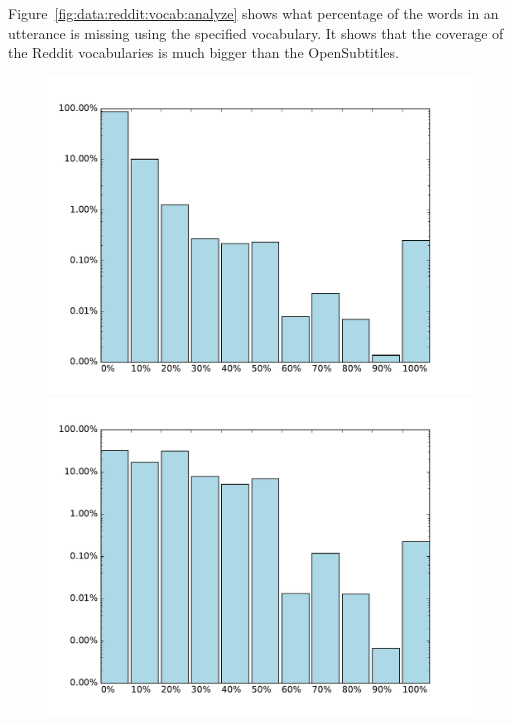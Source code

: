 Figure~\ref{fig:data:reddit:vocab:analyze} shows what percentage of the words in an utterance is missing using the specified vocabulary. It shows that the coverage of the Reddit vocabularies is much bigger than the OpenSubtitles.

\begin{figure}[H]
	\includegraphics[width=\linewidth]{img/reddit_vocab_analyze_100k_perc.pdf}
	\centering
	\small
	\endminipage\hfill
	\includegraphics[width=\linewidth]{img/opus_vocab_analyze_100k_perc.pdf}
	\centering
	\small
	\endminipage\hfill

\end{figure}
